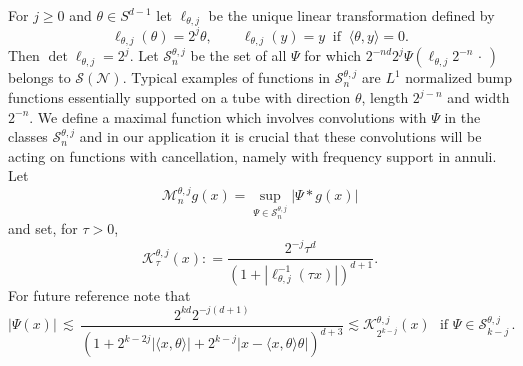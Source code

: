 \documentclass[11pt]{amsart}
\theoremstyle{definition}
\numberwithin{theorem}{section}
\numberwithin{definition}{section}
\def\inn#1#2{\langle#1,#2\rangle}
\newcommand{\Be}{\begin{equation}}
\newcommand{\Ee}{\end{equation}}
\newcommand{\note}[1]{\footnote{\texttt{\Small #1}}}
\def\inn#1#2{\langle#1,#2\rangle}
\def\lc{\lesssim}
\def\cK{{\mathcal {K}}}
\def\cM{{\mathcal {M}}}
\def\cN{{\mathcal {N}}}
\def\cS{{\mathcal {S}}}
\begin{document}
For  $j\ge 0$ and $\theta\in S^{d-1}$ let $\ell_{\theta,j}$ be the unique linear transformation defined by
$$
\ell_{\theta,j} (\theta)= 2^j\theta, \qquad
\ell_{\theta,j} (y)= y\ \text{ if }\ \inn{\theta}{y}=0.
$$
Then $\det \ell_{\theta,j}= 2^j$.
Let $\cS^{\theta,j}_n$ be the set of all
$\Psi$ for which
$2^{-nd}2^j \Psi (\ell_{\theta,j} 2^{-n} \,\cdot\,)$ belongs to $\cS(\cN)$.
Typical examples of  functions in $\cS^{\theta,j}_n$ are $L^1$ normalized
 bump functions  essentially supported on a tube with direction
$\theta$,  length $2^{j-n}$ and width $2^{-n}$. We define a maximal function which involves convolutions with
 $\Psi$ in the
classes   $\cS^{\theta,j}_n$  and in our application it is crucial that
these  convolutions
will be acting on functions with cancellation, namely with frequency support in annuli.
Let $$\cM^{\theta,j}_n g(x)= \sup_{\Psi\in \cS^{\theta,j}_n}|\Psi* g(x)|$$
and set, for $\tau>0$,
\Be \label{cKkernel}
\cK_\tau^{\theta,j}(x)
: = \frac{2^{-j}\tau^d}
 {(1+| \ell_{\theta,j}^{-1}(\tau x)|)^{d+1}}.
\Ee
For future reference note that
\Be \label{Psiestim}
|\Psi(x)|
\,\lc \,
\frac{2^{kd}2^{-j(d+1)}}
 {(1+ 2^{k-2j}|\inn x\theta| +2^{k-j}|x-\inn x\theta \theta|)^{d+3}}
\lc\cK_{2^{k-j}}^{\theta,j}(x)
\,\,\text{ if  $\Psi\in \cS^{\theta,j}_{k-j}\,.$}
\Ee
\end{document}
